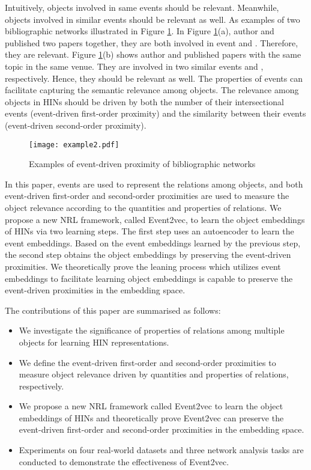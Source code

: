 Intuitively, objects involved in same events should be relevant. Meanwhile, objects involved in similar events should be relevant as well. As examples of two bibliographic networks illustrated in Figure \ref{figure2}. In Figure \ref{figure2}(a), author  and  published two papers together, they are both involved in event  and . Therefore, they are relevant. Figure \ref{figure2}(b) shows author  and  published papers with the same topic in the same venue. They are involved in two similar events  and , respectively. Hence, they should be relevant as well. The properties of events can facilitate capturing the semantic relevance among objects. The relevance among objects in HINs should be driven by both the number of their intersectional events (event-driven first-order proximity) and the similarity between their events (event-driven second-order proximity).

\begin{figure}
	\centering
	\texttt{[image: example2.pdf]}
	\caption{Examples of event-driven proximity of bibliographic networks}\label{figure2}
\end{figure}

In this paper, events are used to represent the relations among objects, and both event-driven first-order and second-order proximities are used to measure the object relevance according to the quantities and properties of relations. We propose a new NRL framework, called Event2vec, to learn the object embeddings of HINs via two learning steps. The first step uses an autoencoder to learn the event embeddings. Based on the event embeddings learned by the previous step, the second step obtains the object embeddings by preserving the event-driven proximities. We theoretically prove the leaning process which utilizes event embeddings to facilitate learning object embeddings is capable to preserve the event-driven proximities in the embedding space.

The contributions of this paper are summarised as follows:

\begin{itemize}
	\item We investigate the significance of properties of relations among multiple objects for learning HIN representations.
	\item We define the event-driven first-order and second-order proximities to measure object relevance driven by quantities and properties of relations, respectively.
	\item We propose a new NRL framework called Event2vec to learn the object embeddings of HINs and theoretically prove Event2vec can preserve the event-driven first-order and second-order proximities in the embedding space.
	\item Experiments on four real-world datasets and three network analysis tasks are conducted to demonstrate the effectiveness of Event2vec.
\end{itemize}

